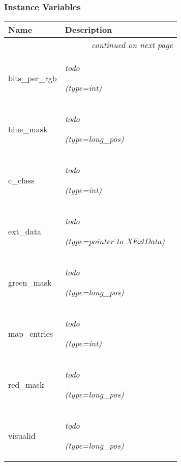 
  \subsubsection{Instance Variables}

    \vspace{-1cm}
\hspace{\varindent}\begin{longtable}{|p{\varnamewidth}|p{\vardescrwidth}|l}
\cline{1-2}
\cline{1-2} \centering \textbf{Name} & \centering \textbf{Description}& \\
\cline{1-2}
\endhead\cline{1-2}\multicolumn{3}{r}{\small\textit{continued on next page}}\\\endfoot\cline{1-2}
\endlastfoot\raggedright b\-i\-t\-s\-\_\-p\-e\-r\-\_\-r\-g\-b\- & \raggedright \emph{todo}

            {\it (type=int)}&\\
\cline{1-2}
\raggedright b\-l\-u\-e\-\_\-m\-a\-s\-k\- & \raggedright \emph{todo}

            {\it (type=long\_pos)}&\\
\cline{1-2}
\raggedright c\-\_\-c\-l\-a\-s\-s\- & \raggedright \emph{todo}

            {\it (type=int)}&\\
\cline{1-2}
\raggedright e\-x\-t\-\_\-d\-a\-t\-a\- & \raggedright \emph{todo}

            {\it (type=pointer to XExtData)}&\\
\cline{1-2}
\raggedright g\-r\-e\-e\-n\-\_\-m\-a\-s\-k\- & \raggedright \emph{todo}

            {\it (type=long\_pos)}&\\
\cline{1-2}
\raggedright m\-a\-p\-\_\-e\-n\-t\-r\-i\-e\-s\- & \raggedright \emph{todo}

            {\it (type=int)}&\\
\cline{1-2}
\raggedright r\-e\-d\-\_\-m\-a\-s\-k\- & \raggedright \emph{todo}

            {\it (type=long\_pos)}&\\
\cline{1-2}
\raggedright v\-i\-s\-u\-a\-l\-i\-d\- & \raggedright \emph{todo}

            {\it (type=long\_pos)}&\\
\cline{1-2}
\end{longtable}

